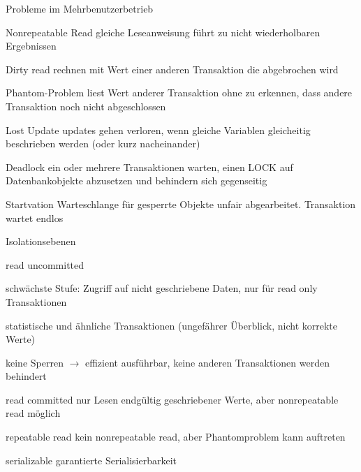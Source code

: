 \documentclass[a4paper]{article}
\begin{document}
\begin{multicols}{3}
    Probleme im Mehrbenutzerbetrieb
    \begin{description*}
        \item[Nonrepeatable Read] gleiche Leseanweisung führt zu nicht wiederholbaren Ergebnissen
        \item[Dirty read] rechnen mit Wert einer anderen Transaktion die abgebrochen wird
        \item[Phantom-Problem] liest Wert anderer Transaktion ohne zu erkennen, dass andere Transaktion noch nicht abgeschlossen
        \item[Lost Update] updates gehen verloren, wenn gleiche Variablen gleicheitig beschrieben werden (oder kurz nacheinander)
        \item[Deadlock] ein oder mehrere Transaktionen warten, einen LOCK auf Datenbankobjekte abzusetzen und behindern sich gegenseitig
        \item[Startvation] Warteschlange für gesperrte Objekte unfair abgearbeitet. Transaktion wartet endlos
    \end{description*}

    Isolationsebenen
    \begin{description*}
        \item[read uncommitted]
        \begin{itemize*}
            \item schwächste Stufe: Zugriff auf nicht geschriebene Daten, nur für read only Transaktionen
            \item statistische und ähnliche Transaktionen (ungefährer Überblick, nicht korrekte Werte)
            \item keine Sperren $\rightarrow$ effizient ausführbar, keine anderen Transaktionen werden behindert
        \end{itemize*}
        \item[read committed] nur Lesen endgültig geschriebener Werte, aber nonrepeatable read möglich
        \item[repeatable read] kein nonrepeatable read, aber Phantomproblem kann auftreten
        \item[serializable] garantierte Serialisierbarkeit
    \end{description*}


\end{multicols}
\end{document}
